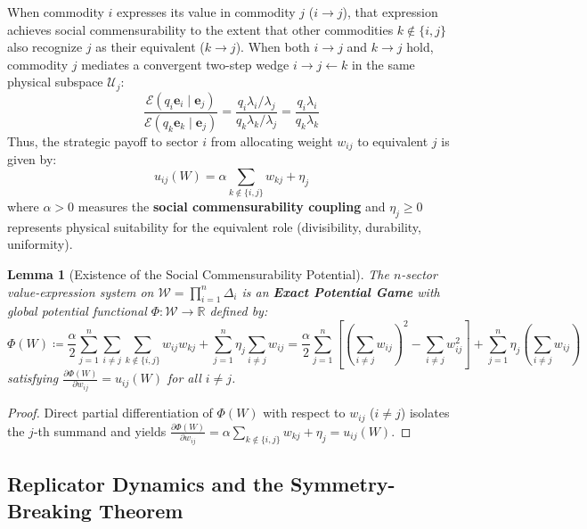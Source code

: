 \documentclass[11pt,a4paper]{article}
\newtheorem{lemma}{Lemma}[section]
\begin{document}
When commodity $i$ expresses its value in commodity $j$ ($i \to j$), that expression achieves social commensurability to the extent that other commodities $k \notin \{i, j\}$ also recognize $j$ as their equivalent ($k \to j$). When both $i \to j$ and $k \to j$ hold, commodity $j$ mediates a convergent two-step wedge $i \to j \leftarrow k$ in the same physical subspace $\mathcal{U}_j$:
\begin{equation}
    \frac{\mathcal{E}(q_i \mathbf{e}_i \mid \mathbf{e}_j)}{\mathcal{E}(q_k \mathbf{e}_k \mid \mathbf{e}_j)} = \frac{q_i \lambda_i / \lambda_j}{q_k \lambda_k / \lambda_j} = \frac{q_i \lambda_i}{q_k \lambda_k}
\end{equation}
Thus, the strategic payoff to sector $i$ from allocating weight $w_{ij}$ to equivalent $j$ is given by:
\begin{equation}
    u_{ij}(W) = \alpha \sum_{k \notin \{i, j\}} w_{kj} + \eta_j
\end{equation}
where $\alpha > 0$ measures the \textbf{social commensurability coupling} and $\eta_j \ge 0$ represents physical suitability for the equivalent role (divisibility, durability, uniformity).

\begin{lemma}[Existence of the Social Commensurability Potential]
The $n$-sector value-expression system on $\mathcal{W} = \prod_{i=1}^n \Delta_i$ is an \textbf{Exact Potential Game} with global potential functional $\Phi: \mathcal{W} \to \mathbb{R}$ defined by:
\begin{equation}
    \Phi(W) \coloneqq \frac{\alpha}{2} \sum_{j=1}^n \sum_{i \neq j} \sum_{k \notin \{i, j\}} w_{ij} w_{kj} + \sum_{j=1}^n \eta_j \sum_{i \neq j} w_{ij} = \frac{\alpha}{2} \sum_{j=1}^n \left[ \left(\sum_{i \neq j} w_{ij}\right)^2 - \sum_{i \neq j} w_{ij}^2 \right] + \sum_{j=1}^n \eta_j \left(\sum_{i \neq j} w_{ij}\right)
\end{equation}
satisfying $\frac{\partial \Phi(W)}{\partial w_{ij}} = u_{ij}(W)$ for all $i \neq j$.
\end{lemma}

\begin{proof}
Direct partial differentiation of $\Phi(W)$ with respect to $w_{ij}$ ($i \neq j$) isolates the $j$-th summand and yields $\frac{\partial \Phi(W)}{\partial w_{ij}} = \alpha \sum_{k \notin \{i, j\}} w_{kj} + \eta_j = u_{ij}(W)$.
\end{proof}

\subsection{Replicator Dynamics and the Symmetry-Breaking Theorem}
\end{document}
